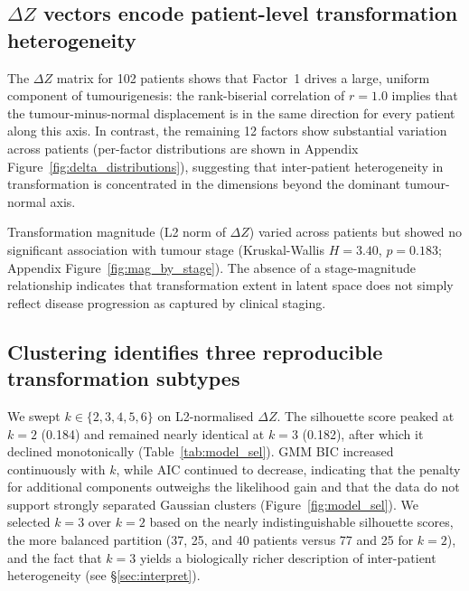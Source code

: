 \subsection{$\Delta Z$ vectors encode patient-level transformation heterogeneity}
\label{sec:delta}

The $\Delta Z$ matrix for 102 patients shows that Factor~1 drives a large, uniform
component of tumourigenesis: the rank-biserial correlation of $r = 1.0$ implies that
the tumour-minus-normal displacement is in the same direction for every patient along
this axis.
In contrast, the remaining 12 factors show substantial variation across patients
(per-factor distributions are shown in Appendix Figure~\ref{fig:delta_distributions}),
suggesting that inter-patient heterogeneity in transformation is concentrated in the
dimensions beyond the dominant tumour-normal axis.

Transformation magnitude (L2 norm of $\Delta Z$) varied across patients but showed
no significant association with tumour stage
(Kruskal-Wallis $H = 3.40$, $p = 0.183$; Appendix Figure~\ref{fig:mag_by_stage}).
The absence of a stage-magnitude relationship indicates that transformation extent
in latent space does not simply reflect disease progression as captured by clinical
staging.

\subsection{Clustering identifies three reproducible transformation subtypes}

We swept $k \in \{2, 3, 4, 5, 6\}$ on L2-normalised $\Delta Z$.
The silhouette score peaked at $k = 2$ (0.184) and remained nearly identical at
$k = 3$ (0.182), after which it declined monotonically (Table~\ref{tab:model_sel}).
GMM BIC increased continuously with $k$, while AIC continued to decrease, indicating
that the penalty for additional components outweighs the likelihood gain and that the
data do not support strongly separated Gaussian clusters (Figure~\ref{fig:model_sel}).
We selected $k = 3$ over $k = 2$ based on the nearly indistinguishable silhouette
scores, the more balanced partition (37, 25, and 40 patients versus 77 and 25 for
$k = 2$), and the fact that $k = 3$ yields a biologically richer description of
inter-patient heterogeneity (see \S\ref{sec:interpret}).

